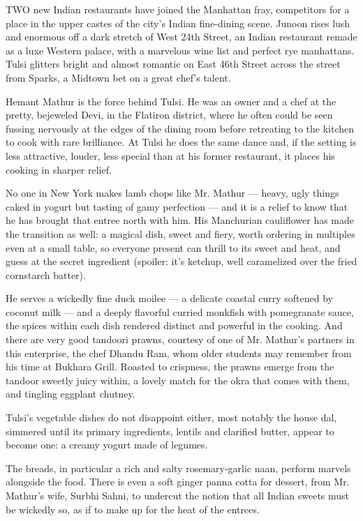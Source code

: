 TWO new Indian restaurants have joined the Manhattan fray, competitors
for a place in the upper castes of the city's Indian fine-dining scene.
Junoon rises lush and enormous off a dark stretch of West 24th Street,
an Indian restaurant remade as a luxe Western palace, with a marvelous
wine list and perfect rye manhattans. Tulsi glitters bright and almost
romantic on East 46th Street across the street from Sparks, a Midtown
bet on a great chef's talent.

Hemant Mathur is the force behind Tulsi. He was an owner and a chef at
the pretty, bejeweled Devi, in the Flatiron district, where he often
could be seen fussing nervously at the edges of the dining room before
retreating to the kitchen to cook with rare brilliance. At Tulsi he does
the same dance and, if the setting is less attractive, louder, less
special than at his former restaurant, it places his cooking in sharper
relief.

No one in New York makes lamb chops like Mr. Mathur --- heavy, ugly
things caked in yogurt but tasting of gamy perfection --- and it is a
relief to know that he has brought that entree north with him. His
Manchurian cauliflower has made the transition as well: a magical dish,
sweet and fiery, worth ordering in multiples even at a small table, so
everyone present can thrill to its sweet and heat, and guess at the
secret ingredient (spoiler: it's ketchup, well caramelized over the
fried cornstarch batter).

He serves a wickedly fine duck moilee --- a delicate coastal curry
softened by coconut milk --- and a deeply flavorful curried monkfish
with pomegranate sauce, the spices within each dish rendered distinct
and powerful in the cooking. And there are very good tandoori prawns,
courtesy of one of Mr. Mathur's partners in this enterprise, the chef
Dhandu Ram, whom older students may remember from his time at Bukhara
Grill. Roasted to crispness, the prawns emerge from the tandoor sweetly
juicy within, a lovely match for the okra that comes with them, and
tingling eggplant chutney.

Tulsi's vegetable dishes do not disappoint either, most notably the
house dal, simmered until its primary ingredients, lentils and clarified
butter, appear to become one: a creamy yogurt made of legumes.

The breads, in particular a rich and salty rosemary-garlic naan, perform
marvels alongside the food. There is even a soft ginger panna cotta for
dessert, from Mr. Mathur's wife, Surbhi Sahni, to undercut the notion
that all Indian sweets must be wickedly so, as if to make up for the
heat of the entrees.

